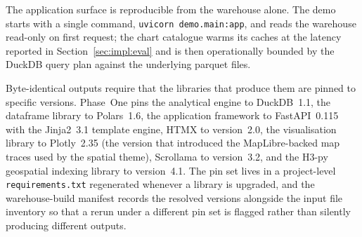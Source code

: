 The application surface is reproducible from the warehouse alone. The
demo starts with a single command, \texttt{uvicorn demo.main:app}, and
reads the warehouse read-only on first request; the chart catalogue
warms its caches at the latency reported in
Section~\ref{sec:impl:eval} and is then operationally bounded by the
DuckDB query plan against the underlying parquet files.

Byte-identical outputs require that the libraries that produce them
are pinned to specific versions. Phase~One pins the analytical engine
to DuckDB~1.1, the dataframe library to Polars~1.6, the application
framework to FastAPI~0.115 with the Jinja2~3.1 template engine, HTMX
to version~2.0, the visualisation library to Plotly~2.35 (the version
that introduced the MapLibre-backed map traces used by the spatial
theme), Scrollama to version~3.2, and the H3-py geospatial indexing
library to version~4.1. The pin set lives in a project-level
\texttt{requirements.txt} regenerated whenever a library is upgraded,
and the warehouse-build manifest records the resolved versions
alongside the input file inventory so that a rerun under a different
pin set is flagged rather than silently producing different outputs.
